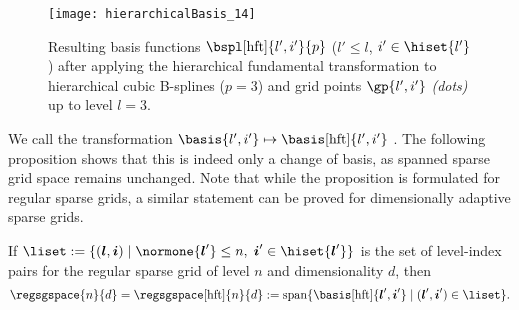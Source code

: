 \begin{SCfigure}
  \texttt{[image: hierarchicalBasis\_14]}%
  \caption[%
    Hierarchical fundamental transformation on hierarchical B-splines%
  ]{%
    Resulting basis functions $\bspl[\hft]{l',i'}{p}$
    ($l' \le l$, $i' \in \hiset{l'}$)
    after applying the hierarchical fundamental transformation
    to hierarchical cubic B-splines ($p = 3$) and
    grid points $\gp{l',i'}$ \emph{(dots)} up to level $l = 3$.%
  }%
  \label{fig:hftBSpline}%
\end{SCfigure}

We call the transformation $\basis{l',i'} \mapsto \basis[\hft]{l',i'}$
\term{\hftr}.
The following proposition shows that this is indeed only a change of basis,
as spanned sparse grid space remains unchanged.
Note that while the proposition is formulated for regular sparse grids,
a similar statement can be proved for dimensionally adaptive sparse grids.

\begin{proposition}
  \label{prop:hftSparseGridSpace}
  If $\liset := \{(\*l, \*i) \mid
  \normone{\*l'} \le n,\; \*i' \in \hiset{\*l'}\}$
  is the set of level-index pairs for the regular sparse grid of level $n$
  and dimensionality $d$, then
  \begin{equation}
    \regsgspace{n}{d}
    = \regsgspace[\hft]{n}{d}
    := \spn\{\basis[\hft]{\*l',\*i'} \mid (\*l', \*i') \in \liset\}.
  \end{equation}
\end{proposition}

